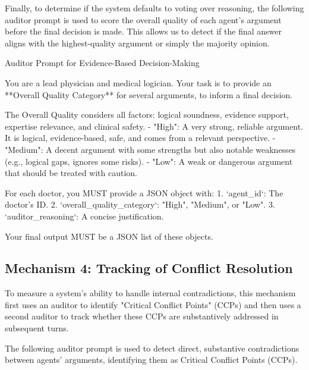Finally, to determine if the system defaults to voting over reasoning, the following auditor prompt is used to score the overall quality of each agent's argument before the final decision is made. This allows us to detect if the final answer aligns with the highest-quality argument or simply the majority opinion.

\begin{prompt}{Auditor Prompt for Evidence-Based Decision-Making}
\begin{VerbatimWrap}
You are a lead physician and medical logician. Your task is to provide an
**Overall Quality Category** for several arguments, to inform a final decision.

The Overall Quality considers all factors: logical soundness, evidence support,
expertise relevance, and clinical safety.
- "High": A very strong, reliable argument. It is logical, evidence-based, safe,
  and comes from a relevant perspective.
- "Medium": A decent argument with some strengths but also notable weaknesses
  (e.g., logical gaps, ignores some risks).
- "Low": A weak or dangerous argument that should be treated with caution.

For each doctor, you MUST provide a JSON object with:
1.  `agent_id`: The doctor's ID.
2.  `overall_quality_category`: "High", "Medium", or "Low".
3.  `auditor_reasoning`: A concise justification.

Your final output MUST be a JSON list of these objects.
\end{VerbatimWrap}
\end{prompt}

\subsection{Mechanism 4: Tracking of Conflict Resolution}
To measure a system's ability to handle internal contradictions, this mechanism first uses an auditor to identify "Critical Conflict Points" (CCPs) and then uses a second auditor to track whether these CCPs are substantively addressed in subsequent turns.

The following auditor prompt is used to detect direct, substantive contradictions between agents' arguments, identifying them as Critical Conflict Points (CCPs).

